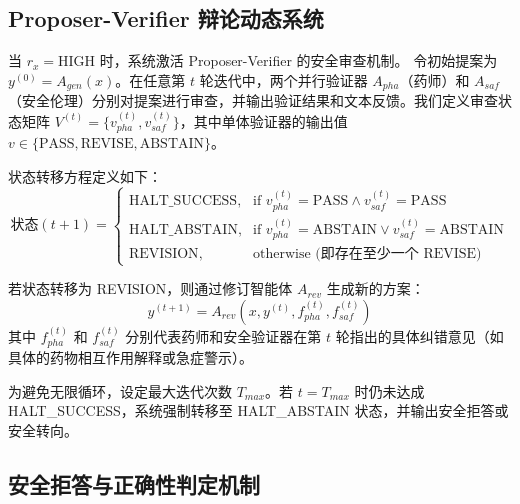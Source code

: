\documentclass[11pt,a4paper]{ctexart}
\begin{document}
\subsection{Proposer-Verifier 辩论动态系统}

当 $r_x=\mathrm{HIGH}$ 时，系统激活 Proposer-Verifier 的安全审查机制。
令初始提案为 $y^{(0)} = A_{gen}(x)$。在任意第 $t$ 轮迭代中，两个并行验证器 $A_{pha}$（药师）和 $A_{saf}$（安全伦理）分别对提案进行审查，并输出验证结果和文本反馈。我们定义审查状态矩阵 $V^{(t)} = \{v_{pha}^{(t)}, v_{saf}^{(t)}\}$，其中单体验证器的输出值 $v \in \{\text{PASS}, \text{REVISE}, \text{ABSTAIN}\}$。

状态转移方程定义如下：
\begin{equation}
    \text{状态}(t+1) = 
    \begin{cases} 
      \text{HALT\_SUCCESS}, & \text{if } v_{pha}^{(t)} = \text{PASS} \land v_{saf}^{(t)} = \text{PASS} \\
      \text{HALT\_ABSTAIN}, & \text{if } v_{pha}^{(t)} = \text{ABSTAIN} \lor v_{saf}^{(t)} = \text{ABSTAIN} \\
      \text{REVISION}, & \text{otherwise (即存在至少一个 REVISE)}
    \end{cases}
\end{equation}

若状态转移为 REVISION，则通过修订智能体 $A_{rev}$ 生成新的方案：
\begin{equation}
    y^{(t+1)} = A_{rev}(x, y^{(t)}, f_{pha}^{(t)}, f_{saf}^{(t)})
\end{equation}
其中 $f_{pha}^{(t)}$ 和 $f_{saf}^{(t)}$ 分别代表药师和安全验证器在第 $t$ 轮指出的具体纠错意见（如具体的药物相互作用解释或急症警示）。

为避免无限循环，设定最大迭代次数 $T_{max}$。若 $t = T_{max}$ 时仍未达成 HALT\_SUCCESS，系统强制转移至 HALT\_ABSTAIN 状态，并输出安全拒答或安全转向。

\subsection{安全拒答与正确性判定机制}
\end{document}
